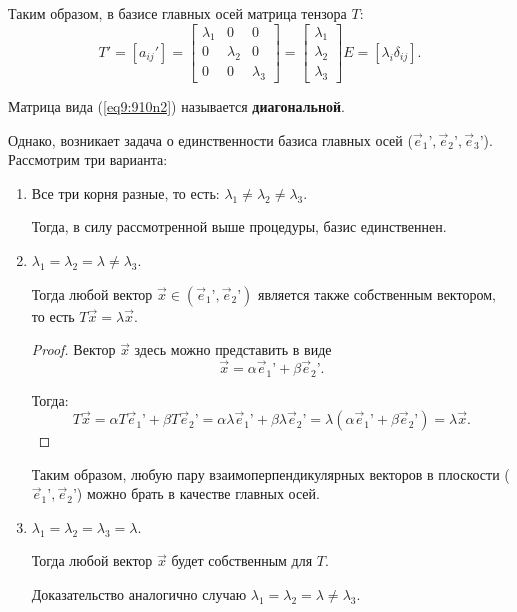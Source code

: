 	Таким образом, в базисе главных осей матрица тензора \( T \):
	\begin{equation}
		T' = [a_{ij}{'}] =
		\begin{bmatrix}
			\lambda_1 & 0 & 0 \\
			0 & \lambda_2 & 0 \\
			0 & 0 & \lambda_3
		\end{bmatrix} = 
		\begin{bmatrix}
			\lambda_1 \\ \lambda_2 \\ \lambda_3
		\end{bmatrix}E
		= [\lambda_i \delta_{ij}]. \label{eq9:910n2}
	\end{equation}
	
	\begin{definition}
	Матрица вида (\ref{eq9:910n2}) называется \textbf{диагональной}.
	\end{definition}
	
	Однако, возникает задача о единственности базиса главных осей (\( \vec{e}_1{’}, \vec{e}_2{’}, \vec{e}_3{’} \)). Рассмотрим три варианта:
	\begin{enumerate}
	\item Все три корня разные, то есть: \( \lambda_1 \ne \lambda_2 \ne \lambda_3 \).
	
	Тогда, в силу рассмотренной выше процедуры, базис единственнен.
	
	\item \( \lambda_1 = \lambda_2 = \lambda \ne \lambda_3 \).
	
	Тогда любой вектор \( \vec{x} \in (\vec{e}_1{’}, \vec{e}_2{’}) \) является также собственным вектором, то есть \( T\vec{x} = \lambda\vec{x} \).
	
	\begin{proof}
	
	Вектор \( \vec{x} \) здесь можно представить в виде
	\[ \vec{x} = \alpha\vec{e}_1{’} + \beta\vec{e}_2{’}. \]
	
	Тогда:
	\[ T\vec{x} = \alpha T\vec{e}_1{’} + \beta T\vec{e}_2{’} = \alpha\lambda\vec{e}_1{’} + \beta\lambda\vec{e}_2{’} = \lambda(\alpha\vec{e}_1{’} + \beta\vec{e}_2{’}) = \lambda\vec{x}. \]
	\end{proof}
	
	Таким образом, любую пару взаимоперпендикулярных векторов в плоскости (\( \vec{e}_1{’}, \vec{e}_2{’} \)) можно брать в качестве главных осей.

	\item \( \lambda_1 = \lambda_2 = \lambda_3 = \lambda \).
	
	Тогда любой вектор \( \vec{x} \) будет собственным для \( T \).
	
	Доказательство аналогично случаю \( \lambda_1 = \lambda_2 = \lambda \ne \lambda_3 \).
	\end{enumerate}
	
